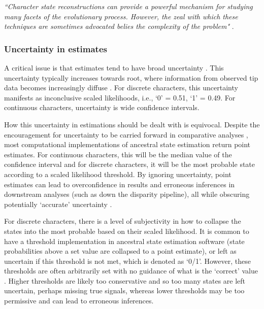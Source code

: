 \documentclass[titlepage]{article}
\begin{document}
\textit{``Character state reconstructions can provide a powerful mechanism for studying many facets of the evolutionary process. However, the zeal with which these techniques are sometimes advocated belies the complexity of the problem"} \citep{swofford1992parsimony}.

\subsubsection{Uncertainty in estimates}
A critical issue is that estimates tend to have broad uncertainty \citep{schluter1997likelihood}.
This uncertainty typically increases towards root, where information from observed tip data becomes increasingly diffuse \citep{gascuel2014predicting}.
For discrete characters, this uncertainty manifests as inconclusive scaled likelihoods, i.e., `0' = 0.51, `1' = 0.49.
For continuous characters, uncertainty is wide confidence intervals.

How this uncertainty in estimations should be dealt with is equivocal.
Despite the encouragement for uncertainty to be carried forward in comparative analyses \citep{silvestro2015measurement}, most computational implementations of ancestral state estimation return point estimates.
For continuous characters, this will be the median value of the confidence interval and for discrete characters, it will be the most probable state according to a scaled likelihood threshold.
By ignoring uncertainty, point estimates can lead to overconfidence in results and erroneous inferences in downstream analyses (such as down the disparity pipeline), all while obscuring potentially `accurate' uncertainty \citep{ackerly2006niche,vanderpoorten2006mapping}.

For discrete characters, there is a level of subjectivity in how to collapse the states into the most probable based on their scaled likelihood.
It is common to have a threshold implementation in ancestral state estimation software (state probabilities above a set value are collapsed to a point estimate), or left as uncertain if this threshold is not met, which is denoted as `0/1'.
However, these thresholds are often arbitrarily set with no guidance of what is the `correct' value \citep{smith2022evolution,casali2023morphological}.
Higher thresholds are likely too conservative and so too many states are left uncertain, perhaps missing true signals, whereas lower thresholds may be too permissive and can lead to erroneous inferences.
\end{document}
